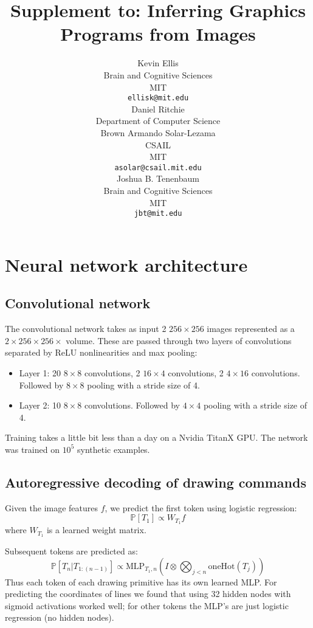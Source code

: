\documentclass{article}
\title{Supplement to: Inferring Graphics Programs from Images}
\author{
Kevin Ellis \\
Brain and Cognitive Sciences\\
MIT\\
\texttt{ellisk@mit.edu} \\
Daniel Ritchie\\
Department of Computer Science\\
Brown
\And
Armando Solar-Lezama \\
  CSAIL\\
MIT \\
\texttt{asolar@csail.mit.edu} \\
\And
Joshua B. Tenenbaum \\
Brain and Cognitive Sciences\\
MIT\\
\texttt{jbt@mit.edu} \\
}
\newcommand{\probability}{\mathds{P}} %
\begin{document}

\maketitle

\section{Neural network architecture}

\subsection{Convolutional network}
The convolutional network takes as input 2 $256\times 256$ images
represented as a $2\times 256\times 256\times$ volume. These are
passed through two layers of convolutions separated by ReLU
nonlinearities and max pooling:
\begin{itemize}
\item Layer 1: 20 $8\times 8$ convolutions, 2 $16\times 4$ convolutions, 2 $4\times 16$ convolutions. Followed by $8\times 8$ pooling with a stride size of 4.
\item Layer 2: 10 $8\times 8$ convolutions. Followed by $4\times 4$ pooling with a stride size of 4.
\end{itemize}
Training takes a little bit less than a day on a Nvidia TitanX GPU.
The network was trained on $10^5$ synthetic examples.

\subsection{Autoregressive decoding of drawing commands}

Given the image features $f$, we predict the first token using logistic regression:
\begin{equation}
  \probability [T_1]\propto W_{T_1}f
\end{equation}
where $W_{T_1}$ is a learned weight matrix.

Subsequent tokens are predicted as:
\begin{equation}
  \probability [T_n|T_{1:(n - 1)}]\propto \text{MLP}_{T_1,n}(I \otimes \bigotimes_{j < n} \text{oneHot}(T_j))
\end{equation}
Thus each token of each drawing primitive has its own learned MLP.
For predicting the coordinates of lines we found that using 32 hidden nodes with sigmoid activations worked well;
for other tokens the MLP's are just logistic regression (no hidden nodes).
\end{document}
